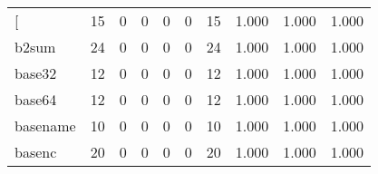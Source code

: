\begin{longtable}{lp{1.3cm}p{1.3cm}p{1.3cm}p{1.3cm}p{1.3cm}p{1.3cm}p{1.3cm}p{1.3cm}p{1.3cm}}
\bottomrule
\endlastfoot
{[}         &                     15 &                                             0 &                                            0 &                                           0 &                                            0 &                                         15 &                                1.000 &                                  1.000 &                                1.000 \\
b2sum     &                     24 &                                             0 &                                            0 &                                           0 &                                            0 &                                         24 &                                1.000 &                                  1.000 &                                1.000 \\
base32    &                     12 &                                             0 &                                            0 &                                           0 &                                            0 &                                         12 &                                1.000 &                                  1.000 &                                1.000 \\
base64    &                     12 &                                             0 &                                            0 &                                           0 &                                            0 &                                         12 &                                1.000 &                                  1.000 &                                1.000 \\
basename  &                     10 &                                             0 &                                            0 &                                           0 &                                            0 &                                         10 &                                1.000 &                                  1.000 &                                1.000 \\
basenc    &                     20 &                                             0 &                                            0 &                                           0 &                                            0 &                                         20 &                                1.000 &                                  1.000 &                                1.000 \\

\end{longtable}
